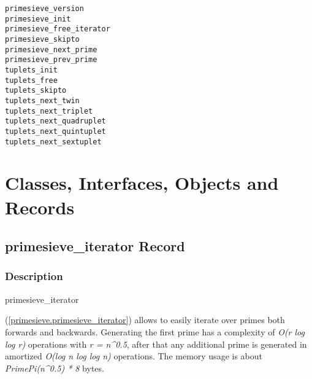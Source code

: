 \documentclass{report}
\newif\ifpdf
\begin{document}
\begin{description}
\item[\texttt{primesieve{\_}version}]
\item[\texttt{primesieve{\_}init}]
\item[\texttt{primesieve{\_}free{\_}iterator}]
\item[\texttt{primesieve{\_}skipto}]
\item[\texttt{primesieve{\_}next{\_}prime}]
\item[\texttt{primesieve{\_}prev{\_}prime}]
\item[\texttt{tuplets{\_}init}]
\item[\texttt{tuplets{\_}free}]
\item[\texttt{tuplets{\_}skipto}]
\item[\texttt{tuplets{\_}next{\_}twin}]
\item[\texttt{tuplets{\_}next{\_}triplet}]
\item[\texttt{tuplets{\_}next{\_}quadruplet}]
\item[\texttt{tuplets{\_}next{\_}quintuplet}]
\item[\texttt{tuplets{\_}next{\_}sextuplet}]
\end{description}
\section{Classes, Interfaces, Objects and Records}
\ifpdf
\subsection*{\large{\textbf{primesieve{\_}iterator Record}}\normalsize\hspace{1ex}\hrulefill}
\else
\subsection*{primesieve{\_}iterator Record}
\fi
\label{primesieve.primesieve_iterator}
\subsubsection*{\large{\textbf{Description}}\normalsize\hspace{1ex}\hfill}
\begin{ttfamily}primesieve{\_}iterator\end{ttfamily}(\ref{primesieve.primesieve_iterator}) allows to easily iterate over primes both forwards and backwards. Generating the first prime has a complexity of \textit{O(r log log r)} operations with \textit{r = n{\^{}}0.5}, after that any additional prime is generated in amortized \textit{O(log n log log n)} operations. The memory usage is about \textit{PrimePi(n{\^{}}0.5) * 8} bytes.
\end{document}
